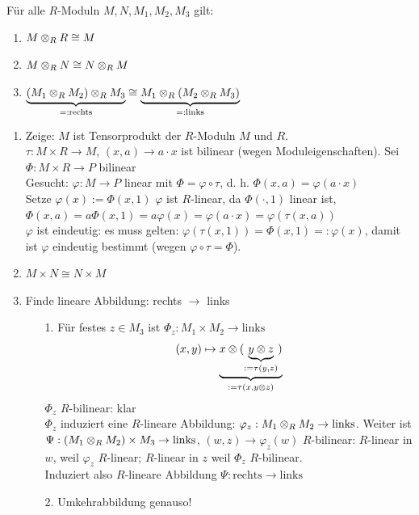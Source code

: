\documentclass[a4paper, 10pt]{report}
\begin{document}
\begin{Bem}
  Für alle $R$-Moduln $M, N, M_1, M_2, M_3$ gilt:
  \begin{enumerate}
  	\item $M \ten[R] R \cong M$
  	\item $M \ten[R] N \cong N \ten[R] M$
  	\item $\underbrace{(M_1 \ten[R] M_2) \ten[R] M_3}_{=: \text{rechts}} \cong 
	\underbrace{M_1 \ten[R] ( M_2 \ten[R] M_3)}_{=: \text{links}}$
  \end{enumerate}
\end{Bem}
\begin{Bew}
  \begin{enumerate}
    \item Zeige: $M$ ist Tensorprodukt der $R$-Moduln $M$ und $R$.\\
	  $\tau: M \times R \rightarrow M$, $(x,a) \rightarrow a \cdot x$ ist bilinear (wegen 
	  Moduleigenschaften). Sei $\Phi: M \times R \rightarrow P$ bilinear\\
	  Gesucht: $\varphi: M \rightarrow P$ linear mit $\Phi = \varphi \circ \tau$, d. h. 
	  $\Phi(x,a) = \varphi(a \cdot x)$\\
	  Setze $\varphi(x) := \Phi(x,1)$ $\varphi$ ist $R$-linear, da $\Phi( \cdot, 1)$ linear
	  ist, $\Phi(x,a) = a\Phi(x,1) = a\varphi(x) = \varphi(a \cdot x ) = \varphi(\tau(x,a))$\\
	  $\varphi$ ist eindeutig: es muss gelten: $\varphi(\tau(x,1)) = \Phi(x,1) =: \varphi(x)$, 
	  damit ist $\varphi$ eindeutig bestimmt (wegen $\varphi \circ \tau = \Phi$).
    \item $M \times N \cong N \times M$
    \item Finde lineare Abbildung: rechts $\rightarrow$ links
	  \begin{enumerate}
	    \item[ 1. ] Für festes $z \in M_3$ ist $\Phi_z: M_1 \times M_2 \rightarrow \text{links}$ 
		  \[
		  (x,y) \mapsto \ub{x \ten (\ub{y \ten z}{:= \tau ( y,z )})}{:=\tau(x,y\ten z)}
		  \]
		  $\Phi_z$ $R$-bilinear: klar\\
		  $\Phi_z$ induziert eine $R$-lineare Abbildung: $\varphi_z: M_1 \ten[R] M_2 \rightarrow \text{links}$.
		  Weiter ist $\Psi: ( M_1 \ten[R] M_2 ) \times M_3 \rightarrow \text{links}$,
		  $(w,z) \rightarrow \varphi_z (w)$
		  $R$-bilinear: $R$-linear in $w$, weil $\varphi_z$ $R$-linear; $R$-linear in $z$ weil $\Phi_z$ $R$-bilinear.\\
		  Induziert also $R$-lineare Abbildung $\Psi: \text{rechts} \rightarrow \text{links}$
	    \item[ 2. ] Umkehrabbildung genauso!
	  \end{enumerate}
  \end{enumerate}
\end{Bew}
\end{document}
